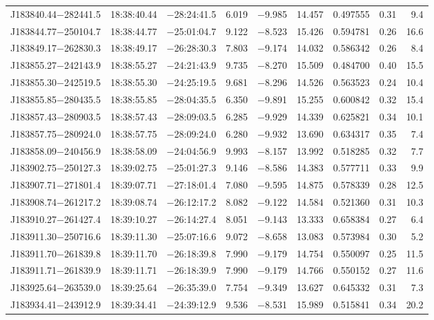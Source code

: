 \begin{table*}
\begin{tabular}{lcccccccr}
J183840.44$-$282441.5 & 18:38:40.44 & $-$28:24:41.5 &  6.019 & $-$9.985 & 14.457 & 0.497555 & 0.31 & 9.4 \\
J183844.77$-$250104.7 & 18:38:44.77 & $-$25:01:04.7 &  9.122 & $-$8.523 & 15.426 & 0.594781 & 0.26 & 16.6 \\
J183849.17$-$262830.3 & 18:38:49.17 & $-$26:28:30.3 &  7.803 & $-$9.174 & 14.032 & 0.586342 & 0.26 & 8.4 \\
J183855.27$-$242143.9 & 18:38:55.27 & $-$24:21:43.9 &  9.735 & $-$8.270 & 15.509 & 0.484700 & 0.40 & 15.5 \\
J183855.30$-$242519.5 & 18:38:55.30 & $-$24:25:19.5 &  9.681 & $-$8.296 & 14.526 & 0.563523 & 0.24 & 10.4 \\
J183855.85$-$280435.5 & 18:38:55.85 & $-$28:04:35.5 &  6.350 & $-$9.891 & 15.255 & 0.600842 & 0.32 & 15.4 \\
J183857.43$-$280903.5 & 18:38:57.43 & $-$28:09:03.5 &  6.285 & $-$9.929 & 14.339 & 0.625821 & 0.34 & 10.1 \\
J183857.75$-$280924.0 & 18:38:57.75 & $-$28:09:24.0 &  6.280 & $-$9.932 & 13.690 & 0.634317 & 0.35 & 7.4 \\
J183858.09$-$240456.9 & 18:38:58.09 & $-$24:04:56.9 &  9.993 & $-$8.157 & 13.992 & 0.518285 & 0.32 & 7.7 \\
J183902.75$-$250127.3 & 18:39:02.75 & $-$25:01:27.3 &  9.146 & $-$8.586 & 14.383 & 0.577711 & 0.33 & 9.9 \\
J183907.71$-$271801.4 & 18:39:07.71 & $-$27:18:01.4 &  7.080 & $-$9.595 & 14.875 & 0.578339 & 0.28 & 12.5 \\
J183908.74$-$261217.2 & 18:39:08.74 & $-$26:12:17.2 &  8.082 & $-$9.122 & 14.584 & 0.521360 & 0.31 & 10.3 \\
J183910.27$-$261427.4 & 18:39:10.27 & $-$26:14:27.4 &  8.051 & $-$9.143 & 13.333 & 0.658384 & 0.27 & 6.4 \\
J183911.30$-$250716.6 & 18:39:11.30 & $-$25:07:16.6 &  9.072 & $-$8.658 & 13.083 & 0.573984 & 0.30 & 5.2 \\
J183911.70$-$261839.8 & 18:39:11.70 & $-$26:18:39.8 &  7.990 & $-$9.179 & 14.754 & 0.550097 & 0.25 & 11.5 \\
J183911.71$-$261839.9 & 18:39:11.71 & $-$26:18:39.9 &  7.990 & $-$9.179 & 14.766 & 0.550152 & 0.27 & 11.6 \\
J183925.64$-$263539.0 & 18:39:25.64 & $-$26:35:39.0 &  7.754 & $-$9.349 & 13.627 & 0.645332 & 0.31 & 7.3 \\
J183934.41$-$243912.9 & 18:39:34.41 & $-$24:39:12.9 &  9.536 & $-$8.531 & 15.989 & 0.515841 & 0.34 & 20.2 \\

\end{tabular}
\end{table*}

